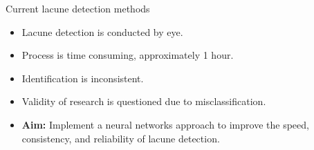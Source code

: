 \documentclass{beamer}
\begin{document}
\begin{frame}{Current lacune detection methods}
\begin{itemize}
\setlength\itemsep{1em}
\item Lacune detection is conducted by eye.
\item Process is time consuming, approximately 1 hour.
\item Identification is inconsistent.
\item Validity of research is questioned due to misclassification.
\pause
\item \textbf{Aim:} Implement a neural networks approach to improve the speed, consistency, and reliability of lacune detection.
\end{itemize}
\end{frame}




\end{document}

